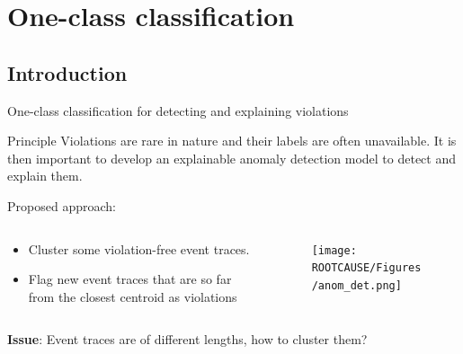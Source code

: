 \documentclass{beamer}
\begin{document}
\section{One-class classification}

\subsection{Introduction}
\begin{frame}{One-class classification for detecting and explaining violations} %

\begin{block}{Principle}
Violations are rare in nature and  their labels are often unavailable. It is then important to develop an explainable anomaly detection model to detect and explain them.

Proposed approach:
\begin{columns}
    \begin{column}{0.7\textwidth}
        \begin{itemize}
            \item Cluster some violation-free event traces. 
            \item Flag new event traces that are so far from the closest centroid as violations
    \end{itemize}
    \end{column}
    \begin{column}{0.3\textwidth}
        \begin{figure}{\textwidth}
        \centering
        \texttt{[image: ROOTCAUSE/Figures/anom\_det.png]}
        \label{fig:my_label}
    \end{figure}
    \end{column}
\end{columns}

\end{block}
\textbf{Issue}: Event traces are of different lengths, how to cluster them?
\end{frame}
\end{document}
